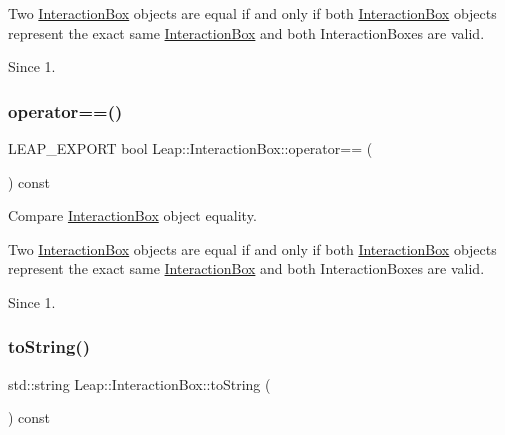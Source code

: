 Two \hyperlink{class_leap_1_1_interaction_box}{Interaction\+Box} objects are equal if and only if both \hyperlink{class_leap_1_1_interaction_box}{Interaction\+Box} objects represent the exact same \hyperlink{class_leap_1_1_interaction_box}{Interaction\+Box} and both Interaction\+Boxes are valid. \begin{DoxySince}{Since}
1. 
\end{DoxySince}
\mbox{\label{class_leap_1_1_interaction_box_a8739be15a1cc736680809aecc624165a}} 
\subsubsection{\texorpdfstring{operator==()}{operator==()}}
{\footnotesize\ttfamily L\+E\+A\+P\+\_\+\+E\+X\+P\+O\+RT bool Leap\+::\+Interaction\+Box\+::operator== (\begin{DoxyParamCaption}\item[{const \hyperlink{class_leap_1_1_interaction_box}{Interaction\+Box} \&}]{ }\end{DoxyParamCaption}) const}

Compare \hyperlink{class_leap_1_1_interaction_box}{Interaction\+Box} object equality.


\begin{DoxyCodeInclude}
\end{DoxyCodeInclude}


Two \hyperlink{class_leap_1_1_interaction_box}{Interaction\+Box} objects are equal if and only if both \hyperlink{class_leap_1_1_interaction_box}{Interaction\+Box} objects represent the exact same \hyperlink{class_leap_1_1_interaction_box}{Interaction\+Box} and both Interaction\+Boxes are valid. \begin{DoxySince}{Since}
1. 
\end{DoxySince}
\mbox{\label{class_leap_1_1_interaction_box_a94603838150c2885c27bb714a28b5d8f}} 
\subsubsection{\texorpdfstring{to\+String()}{toString()}}
{\footnotesize\ttfamily std\+::string Leap\+::\+Interaction\+Box\+::to\+String (\begin{DoxyParamCaption}{ }\end{DoxyParamCaption}) const\hspace{0.3cm}{\ttfamily [inline]}}

